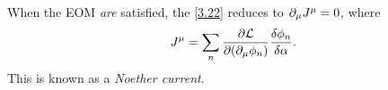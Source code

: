 When the EOM \textit{are} satisfied, the \eqref{3.22} reduces to $\partial_\mu J^\mu=0$, where
\begin{equation}\label{3.23}
	J^\mu =\sum_n\pdv{\mathcal{L}}{(\partial_\mu\phi_n )}\frac{\delta\phi_n }{\delta\alpha }.
\end{equation}
This is known as a \textit{Noether current}.







































